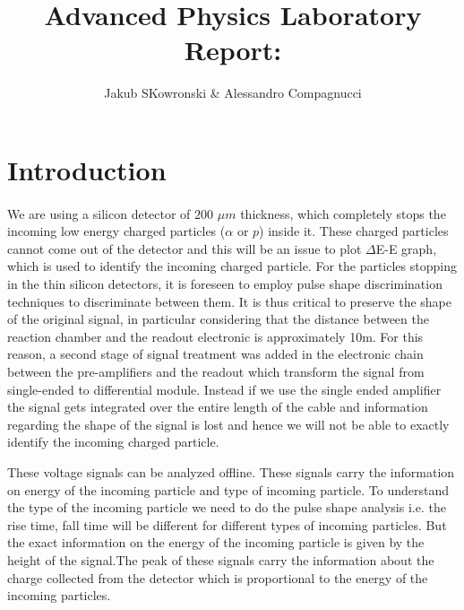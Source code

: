 \documentclass[a4paper, 11pt]{article}
\author{Jakub SKowronski & Alessandro Compagnucci}
\title{Advanced Physics Laboratory Report:}
\begin{document}
\maketitle

\section{Introduction}
 \paragraph{}
 
We are using a silicon detector of $200$ $\mu$$m$ thickness, which completely stops the incoming low energy charged particles ($\alpha$ or $p$) inside it. These charged particles cannot come out of the detector and this will be an issue to plot $\Delta$E-E graph, which is used to identify the incoming charged particle. For the particles stopping in the thin silicon detectors, it is foreseen to employ pulse shape discrimination techniques to discriminate between them. It is thus critical to preserve the shape of the original signal, in particular considering that the distance between the reaction chamber and the readout electronic is approximately 10m. For this reason, a second stage of signal treatment was added in the electronic chain between the pre-amplifiers and the readout which transform the signal from single-ended to differential module. Instead if we use the single ended amplifier the signal gets integrated over the entire length of the cable and information regarding the shape of the signal is lost and hence we will not be able to exactly identify the incoming charged particle.
         
These voltage signals can be analyzed offline. These signals carry the information on energy of the incoming particle and type of incoming particle.  To understand the type of the incoming particle we need to do the pulse shape analysis i.e. the rise time, fall time will be different for different types of incoming particles. But the exact information on the energy of the incoming particle is given by the height of the signal.The peak of these signals carry the information about the charge collected from the detector which is proportional to the energy of the incoming particles.
 
\end{document}
